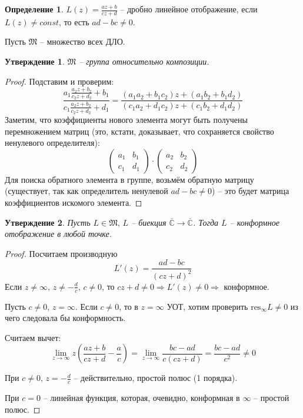 \documentclass[a4paper,12pt]{article}
\theoremstyle{plain}
\newtheorem{proposition}{Утверждение}[section]
\theoremstyle{definition}
\newtheorem{definition}{Определение}[section]
\theoremstyle{remark}
\begin{document}
\begin{definition}
	$L(z) = \frac{az + b}{cz + d}$ -- дробно линейное отображение, если $L(z) \neq const$, то есть $ad - bc \neq 0$.

	Пусть $\mathfrak{M}$ -- множество всех ДЛО.
\end{definition}

\begin{proposition}
	$\mathfrak{M}$ -- группа относительно композиции.
\end{proposition}

\begin{proof}
	Подставим и проверим:
	\[
		\frac{a_1\frac{a_2z + b_2}{c_2z + d_2} + b_1}{c_1\frac{a_2z + b_2}{c_2z + d_2} + d_1} = \frac{(a_1a_2 + b_1c_2)z + (a_1b_2 + b_1d_2)}{(c_1a_2 + d_1c_2)z + (c_1b_2 + d_1d_2)}
	\]
	Заметим, что коэффициенты нового элемента могут быть получены перемножением матриц (это, кстати, доказывает, что сохраняется свойство ненулевого определителя):
	\[
		\begin{pmatrix}
			a_1 & b_1 \\
			c_1 & d_1
		\end{pmatrix}
		\cdot
		\begin{pmatrix}
			a_2 & b_2 \\
			c_2 & d_2
		\end{pmatrix}
	\]
	Для поиска обратного элемента в группе, возьмём обратную матрицу (существует, так как определитель ненулевой $ad - bc \neq 0$) -- это будет матрица коэффициентов искомого элемента.
\end{proof}

\begin{proposition}
	Пусть $L \in \mathfrak{M},\, L$ -- биекция $\overline{\mathbb{C}} \to \overline{\mathbb{C}}$. Тогда $L$ -- конформное отображение в любой точке.
\end{proposition}

\begin{proof}
	Посчитаем производную
	\[
		L'(z) = \frac{ad - bc}{(cz + d)^2}
	\]
	Если $z \neq \infty,\, z \neq -\frac{d}{c},\, c \neq 0$, то $cz + d \neq 0 \Rightarrow L'(z) \neq 0 \Rightarrow$ конформное.

	Пусть $c \neq 0,\, z = \infty$. Если $c \neq 0$, то в $z = \infty$ УОТ, хотим проверить $\text{res}_\infty L \neq 0$ из чего следовала бы конформность.

	Считаем вычет:
	\[
		\lim_{z \to \infty} z\left(\frac{az + b}{cz + d} - \frac{a}{c}\right) = \lim_{z \to \infty} \frac{bc - ad}{c(cz + d)} = \frac{bc - ad}{c^2} \neq 0
	\]

	При $c \neq 0,\, z = -\frac{d}{c}$ -- действительно, простой полюс (1 порядка).

	При $c = 0$ -- линейная функция, которая, очевидно, конформная в $\infty$ -- простой полюс.
\end{proof}
\end{document}
